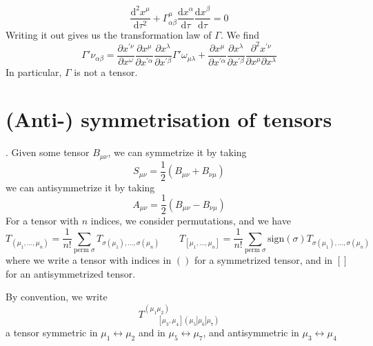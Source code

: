 \documentclass[a4paper]{book}
\theoremstyle{definition}
\theoremstyle{remark}
\begin{document}
\begin{enumerate}
    \begin{equation}
        \frac{\text{d}^2x^\mu}{\text{d}\tau^2} + \Gamma^\mu_{\alpha\beta} \frac{\text{d}x^\alpha}{\text{d}\tau}\frac{\text{d}x^\beta}{\text{d}\tau} = 0
    \end{equation}
    Writing it out gives us the transformation law of $\Gamma$. We find 
    \begin{equation}
        \Gamma{'\nu}_{\alpha\beta} = \frac{\partial x^{'\nu}}{\partial x^{\omega}}\frac{\partial x^{\mu}}{\partial x^{'\alpha}}\frac{\partial x^{\lambda}}{\partial x^{'\beta}}\Gamma{'\omega}_{\mu\lambda} + \frac{\partial x^{\mu}}{\partial x^{'\alpha}}\frac{\partial x^{\lambda}}{\partial x^{'\beta}} \frac{\partial^2 x^{'\nu}}{\partial x^\mu \partial x^{\lambda}}
    \end{equation}
    In particular, $\Gamma$ is not a tensor. 
\end{enumerate}

\section{(Anti-) symmetrisation of tensors}. \newline 
Given some tensor $B_{\mu\nu}$, we can symmetrize it by taking 
\begin{equation}
    S_{\mu\nu} = \frac{1}{2}(B_{\mu\nu} + B_{\nu\mu})
\end{equation}
we can antisymmetrize it by taking 
\begin{equation}
    A_{\mu\nu} = \frac{1}{2}(B_{\mu\nu} - B_{\nu\mu})
\end{equation}
For a tensor with $n$ indices, we consider permutations, and we have 
\begin{equation}
    T_{(\mu_1, \dots, \mu_n)} = \frac{1}{n!}\sum_{\text{perm }\sigma} T_{\sigma(\mu_1), \dots, \sigma(\mu_n)} \qquad T_{[\mu_1, \dots, \mu_n]} = \frac{1}{n!}\sum_{\text{perm }\sigma} \text{sign}(\sigma) T_{\sigma(\mu_1), \dots, \sigma(\mu_n)} \qquad 
\end{equation}
where we write a tensor with indices in $()$ for a symmetrized tensor, and in $[]$ for an antisymmetrized tensor. \par \medskip 

By convention, we write 
\begin{equation}
    T^{(\mu_1 \mu_2)}_{\qquad[\mu_3, \mu_4](\mu_5|\mu_6|\mu_7)}
\end{equation}
a tensor symmetric in $\mu_1 \leftrightarrow \mu_2$ and in $\mu_5 \leftrightarrow \mu_7$, and antisymmetric in $\mu_3 \leftrightarrow \mu_4$ \par \bigskip 
\end{document}
